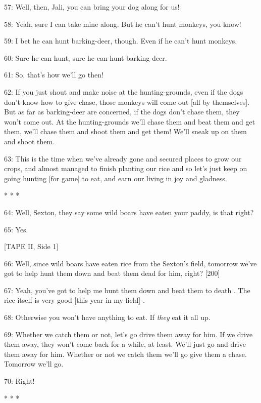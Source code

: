 {\large{}57: Well, then, Jali, you can bring your dog along for us!}

{\large{}58: Yeah, sure I can take mine along. But he can't hunt monkeys, you know!}

{\large{}59: I bet he can hunt barking-deer, though. Even if he can't hunt monkeys.
}

{\large{}60: Sure he can hunt, sure he can hunt barking-deer.}

{\large{}61: So, that's how we'll go then!}

{\large{}62: If you just shout and make noise at the hunting-grounds, even if the
dogs don't know how to  give chase, those monkeys will come out [all by themselves].
But as far as barking-deer are concerned, if the dogs don't chase them, they won't
come out. At the hunting-grounds we'll chase them and beat them and get them, we'll
chase them and shoot them and get them! We'll sneak up on them and shoot them.
}

{\large{}63: This is the time when we've already gone and secured places to grow
our crops, and almost managed to finish planting our rice and so let's just keep
on going hunting [for game] to eat, and earn our living in joy and gladness. }

\begin{center}
{\large{}* * *}
\end{center}

\leftskip=0pt
{\large{}64: Well, Sexton, they say some wild boars have eaten your paddy, is that
right? }

{\large{}65: Yes.}

[TAPE II, Side 1]

66: Well, since wild boars have eaten rice from the Sexton's field,  tomorrow we've
got to help hunt them down and beat them dead for him, right? [200]

67: Yeah, you've got to help me hunt them down and beat them to death . The rice
itself is very good [this year in my field] .

68: Otherwise you won't have anything to eat. If \textit{they} eat it all up.

69: Whether we catch them or not, let's go drive them away for him. If we drive
them away, they won't come back for a while, at least. We'll just go and drive
them away for him. Whether or not we catch them we'll go give them a chase. Tomorrow
we'll go.

70: Right!

\begin{center}
* * *
\end{center}

